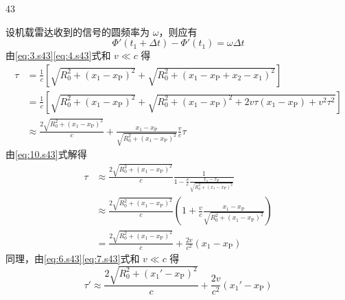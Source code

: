 \begin{solution}{43}
\begin{subsolution}
\begin{equation}
            \label{eq:8.s43}
        \end{equation}
        设机载雷达收到的信号的圆频率为 $\omega$，则应有
        \begin{equation}
            \Phi'(t_{1} + \Delta t) - \Phi'(t_{1}) = \omega\Delta t
            \label{eq:9.s43}
        \end{equation}
        由\eqref{eq:3.s43}\eqref{eq:4.s43}式和 $v \ll c$ 得
        \begin{equation}
            \begin{aligned}
                \tau &= \frac{1}{c}\left[\sqrt{R_{0}^{2} + (x_{1} - x_{\mathrm{P}})^{2}} + \sqrt{R_{0}^{2} + (x_{1} - x_{\mathrm{P}} + x_{2} - x_{1})^{2}}\right] \\
                &= \frac{1}{c}\left[\sqrt{R_{0}^{2} + (x_{1} - x_{\mathrm{P}})^{2}} + \sqrt{R_{0}^{2} + (x_{1} - x_{\mathrm{P}})^{2} + 2v\tau(x_{1} - x_{\mathrm{P}}) + v^{2}\tau^{2}}\right] \\
                &\approx \frac{2\sqrt{R_{0}^{2} + (x_{1} - x_{\mathrm{P}})^{2}}}{c} + \frac{x_{1} - x_{\mathrm{P}}}{\sqrt{R_{0}^{2} + (x_{1} - x_{\mathrm{P}})^{2}}}\frac{v}{c}\tau
            \end{aligned}
            \label{eq:10.s43}
        \end{equation}
        由\eqref{eq:10.s43}式解得
        \begin{equation}
            \begin{aligned}
                \tau &\approx \frac{2\sqrt{R_{0}^{2} + (x_{1} - x_{\mathrm{P}})^{2}}}{c}\frac{1}{1 - \frac{v}{c}\frac{x_{1} - x_{\mathrm{P}}}{\sqrt{R_{0}^{2} + (x_{1} - x_{\mathrm{P}})^{2}}}} \\
                &\approx \frac{2\sqrt{R_{0}^{2} + (x_{1} - x_{\mathrm{P}})^{2}}}{c}\left(1 + \frac{v}{c}\frac{x_{1} - x_{\mathrm{P}}}{\sqrt{R_{0}^{2} + (x_{1} - x_{\mathrm{P}})^{2}}}\right) \\
                &= \frac{2\sqrt{R_{0}^{2} + (x_{1} - x_{\mathrm{P}})^{2}}}{c} + \frac{2v}{c^{2}}(x_{1} - x_{\mathrm{P}})
            \end{aligned}
            \label{eq:11.s43}
        \end{equation}
        同理，由\eqref{eq:6.s43}\eqref{eq:7.s43}式和 $v \ll c$ 得
        \begin{equation}
            \tau' \approx \frac{2\sqrt{R_{0}^{2} + (x_{1}' - x_{\mathrm{P}})^{2}}}{c} + \frac{2v}{c^{2}}(x_{1}' - x_{\mathrm{P}})
            \label{eq:12.s43}
        \end{equation}

\end{subsolution}
\end{solution}
